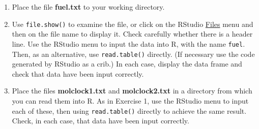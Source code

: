 \begin{enumerate}
\item
Place the file \textbf{fuel.txt} to your working directory.
\item Use \texttt{file.show()} to examine the file, or click on the
  RStudio \underline{Files} menu and then on the file name to display
  it.  Check carefully whether there is a header line.  Use the
  RStudio menu to input the data into R, with the name \texttt{fuel}.
  Then, as an alternative, use \texttt{read.table()} directly.  (If
  necessary use the code generated by RStudio as a crib.)  In each
  case, display the data frame and check that data have been input
  correctly.
\item {} Place the files
  \textbf{molclock1.txt} and \textbf{molclock2.txt} in a directory
  from which you can read them into R.  As in Exercise 1, use the
  RStudio menu to input each of these, then using
  \texttt{read.table()} directly to achieve the same result.  Check,
  in each case, that data have been input correctly.


\end{enumerate}

